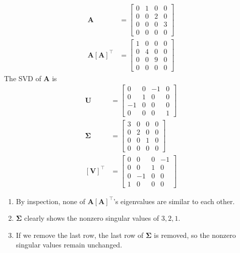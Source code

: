 \documentclass[]{article}
\newcommand{\tpose}[1]{\left[#1\right]^{\! \top} \!\!}
\begin{document}
\section{}

\begin{align}
	\bm{A} &=
	\begin{bmatrix}
	0 & 1 & 0 & 0 \\
	0 & 0 & 2 & 0 \\
	0 & 0 & 0 & 3 \\
	0 & 0 & 0 & 0
	\end{bmatrix} \\
	\bm{A}\tpose{\bm{A}} &=
	\begin{bmatrix}
	1 & 0 & 0 & 0 \\
	0 & 4 & 0 & 0 \\
	0 & 0 & 9 & 0 \\
	0 & 0 & 0 & 0
	\end{bmatrix}
\end{align}
The SVD of \(\bm{A}\) is
\begin{align}
	\bm{U} &=
	\begin{bmatrix}
	0 & 0 & -1 & 0 \\
	0 & 1 & 0 & 0 \\
	-1 & 0 & 0 & 0 \\
	0 & 0 & 0 & 1
	\end{bmatrix} \\
	\bm{\Sigma} &=
	\begin{bmatrix}
	3 & 0 & 0 & 0 \\
	0 & 2 & 0 & 0 \\
	0 & 0 & 1 & 0 \\
	0 & 0 & 0 & 0
	\end{bmatrix} \\
	\tpose{\bm{V}} &=
	\begin{bmatrix}
	0 & 0 & 0 & -1 \\
	0 & 0 & 1 & 0 \\
	0 & -1 & 0 & 0 \\
	1 & 0 & 0 & 0
	\end{bmatrix}
\end{align}

\begin{enumerate}
	\item By inspection, none of \(\bm{A}\tpose{\bm{A}}\)'s eigenvalues are similar to each other.
	\item \(\bm{\Sigma}\) clearly shows the nonzero singular values of \(3, 2, 1\).
	\item If we remove the last row, the last row of \(\bm{\Sigma}\) is removed, so the nonzero singular values remain unchanged.
\end{enumerate}
\end{document}
